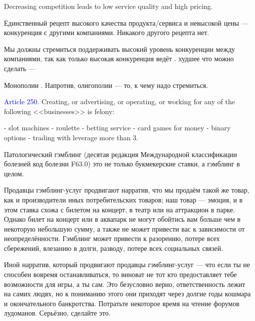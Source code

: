 \documentclass[11pt]{article}
\theoremstyle{remark}
\theoremstyle{definition}
\begin{document}
Decreasing competition leads to low service quality and high pricing.


Единственный рецепт высокого качества продукта/сервиса и невысокой цены --- конкуренция с другими компаниями. Никакого другого рецепта нет.


Мы должны стремиться поддерживать высокий уровень конкуренции между компаниями, так как только высокая конкуренция ведёт .  худшее что можно сделать --- 

Монополии . Напротив, олигополии --- то, к чему надо стремиться. 



\color{black}


\textcolor{blue}{Article 250.} Creating, or advertising, or operating, or working for any of the following <<businesses>> is felony:

- slot machines
- roulette
- betting service
- card games for money
- binary options
- trading with leverage more than 3.



\color{blue}







Патологический гэмблинг (десятая редакция Международной классификации болезней  код болезни F63.0) это не только букмекерские ставки, а гэмблинг в целом. 





Продавцы гэмблинг-услуг продвигают нарратив, что мы продаём такой же товар, как и производители иных потребительских товаров; наш товар --- эмоция, и в этом ставка схожа с билетом на концерт, в театр или на аттракцион в парке. Однако билет на концерт или в аквапарк не могут обойтись вам больше чем в некоторую небольшую сумму, а также не может привести вас к зависимости от неопределённости. Гэмблинг может привести к разорению, потере всех сбережений, влезанию в долги, разводу, потере всех социальных связей.

Иной нарратив, который продвигают продавцы гэмблинг-услуг --- что если ты не способен вовремя останавливаться, то виноват не тот кто предоставляет тебе возможности для игры, а ты сам. Это безусловно верно, ответственность лежит на самих людях, но к пониманию этого они приходят через долгие годы кошмара и окончательного банкротства. Потратьте некоторое время на чтение форумов лудоманов. Серьёзно, сделайте это.
\end{document}
